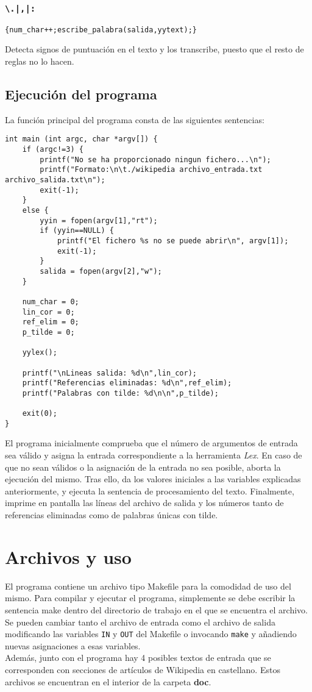 \documentclass[12pt,titlepage,a4paper]{article}
\theoremstyle{definicion}
\theoremstyle{lema}
\theoremstyle{teorema}
\theoremstyle{corolario}
\theoremstyle{ejemplo}
\theoremstyle{nota}
\begin{document}
\subsubsection*{\texttt{\textbackslash.|,|:}}
\begin{lstlisting}
{num_char++;escribe_palabra(salida,yytext);}
\end{lstlisting}
Detecta signos de puntuación en el texto y los transcribe, puesto que el resto
de reglas no lo hacen.

\newpage
\subsection{Ejecución del programa}

La función principal del programa consta de las siguientes sentencias:
\begin{lstlisting}
int main (int argc, char *argv[]) {
    if (argc!=3) {
        printf("No se ha proporcionado ningun fichero...\n");
        printf("Formato:\n\t./wikipedia archivo_entrada.txt archivo_salida.txt\n");
        exit(-1);
    }   
    else {
        yyin = fopen(argv[1],"rt");
        if (yyin==NULL) {
            printf("El fichero %s no se puede abrir\n", argv[1]);
            exit(-1);
        } 
        salida = fopen(argv[2],"w");
    }

    num_char = 0;
    lin_cor = 0;
    ref_elim = 0;
    p_tilde = 0;
    
    yylex();

    printf("\nLineas salida: %d\n",lin_cor);
    printf("Referencias eliminadas: %d\n",ref_elim);
    printf("Palabras con tilde: %d\n\n",p_tilde);

    exit(0);
}
\end{lstlisting}
El programa inicialmente comprueba que el número de argumentos de entrada sea
válido y asigna la entrada correspondiente a la herramienta \emph{Lex}. En 
caso de que no sean válidos o la asignación de la entrada no sea posible, 
aborta la ejecución del mismo. Tras ello, da los valores iniciales a las
variables explicadas anteriormente, y ejecuta la sentencia de procesamiento
del texto. Finalmente, imprime en pantalla las líneas del archivo de salida y
los números tanto de referencias eliminadas como de palabras únicas con tilde.

\newpage
\section{Archivos y uso}

El programa contiene un archivo tipo Makefile para la comodidad de uso del
mismo. Para compilar y ejecutar el programa, simplemente se debe escribir
la sentencia make dentro del directorio de trabajo en el que se encuentra el
archivo. Se pueden cambiar tanto el archivo de entrada como el archivo de
salida modificando las variables \texttt{IN} y \texttt{OUT} del Makefile o
invocando \texttt{make} y añadiendo nuevas asignaciones a esas variables.
\\

Además, junto con el programa hay 4 posibles textos de entrada que se
corresponden con secciones de artículos de Wikipedia en castellano. Estos
archivos se encuentran en el interior de la carpeta \textbf{doc}.
\end{document}
